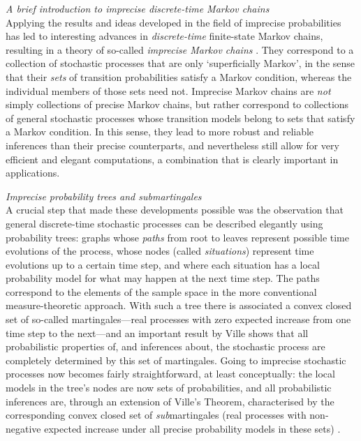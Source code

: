 \documentclass[11pt,dvipsnames,usenames,a4paper]{article}
\begin{document}
\emph{A brief introduction to imprecise discrete-time Markov chains}\\[5pt]
Applying the results and ideas developed in the field of imprecise probabilities has led to interesting advances in \emph{discrete-time} finite-state Markov chains, resulting in a theory of so-called \emph{imprecise Markov chains} \cite{cooman2008,hermans2012,hartfiel1998,skulj2013,cooman2015:markovergodic}.
They correspond to a collection of stochastic processes that are only `superficially Markov', in the sense that their \emph{sets} of transition probabilities satisfy a Markov condition, whereas the individual members of those sets need not.
Imprecise Markov chains are \emph{not} simply collections of precise Markov chains, but rather correspond to collections of general stochastic processes whose transition models belong to sets that satisfy a Markov condition.
In this sense, they lead to more robust and reliable inferences than their precise counterparts, and nevertheless still allow for very efficient and elegant computations, a combination that is clearly important in applications.

\emph{Imprecise probability trees and submartingales}\\[5pt]
A crucial step that made these developments possible was the observation that general discrete-time stochastic processes can be described elegantly using probability trees: graphs whose \emph{paths} from root to leaves represent possible time evolutions of the process, whose nodes (called \emph{situations}) represent time evolutions up to a certain time step, and where each situation has a local probability model for what may happen at the next time step.
The paths correspond to the elements of the sample space in the more conventional measure-theoretic approach.
With such a tree there is associated a convex closed set of so-called martingales---real processes with zero expected increase from one time step to the next---and an important result by Ville \cite{ville1939,shafer2001} shows that all probabilistic properties of, and inferences about, the stochastic process are completely determined by this set of martingales. Going to imprecise stochastic processes now becomes fairly straightforward, at least conceptually: the local models in the tree's nodes are now sets of probabilities, and all probabilistic inferences are, through an extension of Ville's Theorem, characterised by the corresponding convex closed set of \emph{sub}martingales (real processes with non-negative expected increase under all precise probability models in these sets) \cite{cooman2007d,cooman2015:markovergodic}.
\end{document}
